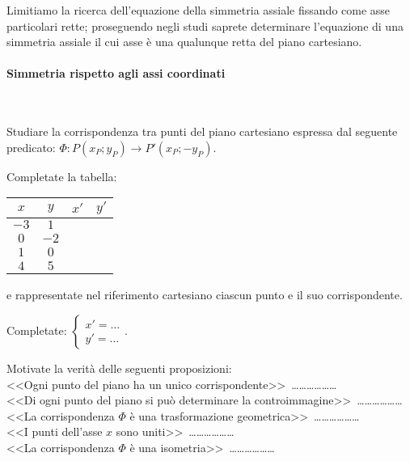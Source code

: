 Limitiamo la ricerca dell'equazione della simmetria assiale fissando 
come asse particolari rette; proseguendo negli studi saprete 
determinare l'equazione di una simmetria assiale il cui asse è una 
qualunque retta del piano cartesiano.

\paragraph{Simmetria rispetto agli assi coordinati}
~

\begin{exrig}
	\begin{esempio}
		Studiare la corrispondenza tra punti del piano cartesiano espressa 
		dal seguente predicato: $\Phi:P(x_P;y_P) \rightarrow 
		P'(x_P;-y_P)$.\vspace{7pt}
		
		Completate la tabella: 
		\begin{center}
			\begin{tabular}{cccc}
				\toprule
				$x$ & $y$ & $x'$ & $y'$\\
				\midrule
				$-3$ & $1$ &  &  \\
				$0$ & $-2$ &  &  \\
				$1$ & $0$ & &  \\
				$4$ & $5$ & &  \\
				\bottomrule
			\end{tabular}
		\end{center}
		
		\noindent e rappresentate nel riferimento cartesiano ciascun punto e 
		il suo corrispondente.
		
		Completate: $\begin{cases}x'=\ldots{} \\ y'=\ldots{}\end{cases}$.
		
		Motivate la verità delle seguenti proposizioni:\\
		<<Ogni punto del piano ha un unico 
		corrispondente>>~\ldots\ldots\ldots\ldots\ldots\ldots{}\\
		<<Di ogni punto del piano si può determinare la 
		controimmagine>>~\ldots\ldots\ldots\ldots\ldots\ldots{}\\
		<<La corrispondenza $\Phi$ è una trasformazione 
		geometrica>>~\ldots\ldots\ldots\ldots\ldots\ldots{}\\
		<<I punti dell'asse $x$ sono 
		uniti>>~\ldots\ldots\ldots\ldots\ldots\ldots{}\\
		<<La corrispondenza $\Phi$ è una 
		isometria>>~\ldots\ldots\ldots\ldots\ldots\ldots{}
	\end{esempio}
\end{exrig}

